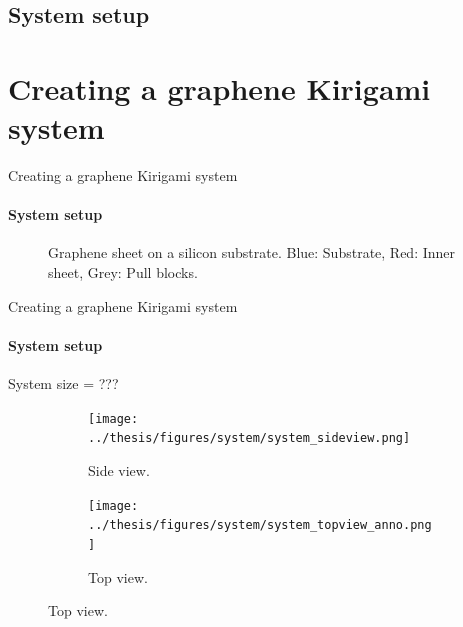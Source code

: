 \documentclass[
	10pt, %
]{beamer}
\begin{document}
\subsection{System setup}
\section{Creating a graphene Kirigami system} %
\begin{frame}{Creating a graphene Kirigami system}
\framesubtitle{System setup}
	\begin{figure}
		\centering    
		\caption{Graphene sheet on a silicon substrate. Blue: Substrate, Red: Inner sheet, Grey: Pull blocks. }
	\end{figure} 
\end{frame}
%
%
\begin{frame}{Creating a graphene Kirigami system}
\framesubtitle{System setup}
	System size = ???

	\begin{figure}[H]
		\centering
		\begin{subfigure}[b]{0.5\textwidth}
			\centering
			\texttt{[image: ../thesis/figures/system/system\_sideview.png]}
			\caption{Side view.}
		\end{subfigure}
		\begin{subfigure}[b]{0.5\textwidth}
			\centering
			\texttt{[image: ../thesis/figures/system/system\_topview\_anno.png]}
			\caption{Top view.}
		\end{subfigure}
	\end{figure}
\end{frame}
%
%
\end{document}
